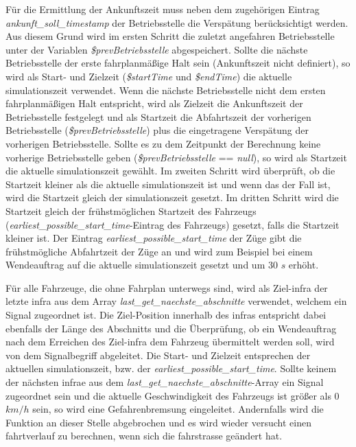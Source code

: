 Für die Ermittlung der Ankunftszeit muss neben dem zugehörigen Eintrag \textit{ankunft\_soll\_timestamp} der Betriebsstelle die Verspätung berücksichtigt werden. Aus diesem Grund wird im ersten Schritt die zuletzt angefahren Betriebsstelle unter der Variablen \textit{\$prevBetriebsstelle} abgespeichert. Sollte die nächste Betriebsstelle der erste fahrplanmäßige Halt sein (Ankunftszeit nicht definiert), so wird als Start- und Zielzeit (\textit{\$startTime} und \textit{\$endTime}) die aktuelle \Gls{simulationszeit} verwendet. Wenn die nächste Betriebsstelle nicht dem ersten fahrplanmäßigen Halt entspricht, wird als Zielzeit die Ankunftszeit der Betriebsstelle festgelegt und als Startzeit die Abfahrtszeit der vorherigen Betriebsstelle (\textit{\$prevBetriebsstelle}) plus die eingetragene Verspätung der vorherigen Betriebsstelle. Sollte es zu dem Zeitpunkt der Berechnung keine vorherige Betriebsstelle geben (\textit{\$prevBetriebsstelle} == \textit{null}), so wird als Startzeit die aktuelle \Gls{simulationszeit} gewählt. Im zweiten Schritt wird überprüft, ob die Startzeit kleiner als die aktuelle \Gls{simulationszeit} ist und wenn das der Fall ist, wird die Startzeit gleich der \Gls{simulationszeit} gesetzt. Im dritten Schritt wird die Startzeit gleich der frühstmöglichen Startzeit des Fahrzeugs (\textit{earliest\_possible\_start\_time}-Eintrag des Fahrzeugs) gesetzt, falls die Startzeit kleiner ist. Der Eintrag \textit{earliest\_possible\_start\_time} der Züge gibt die frühstmögliche Abfahrtzeit der Züge an und wird zum Beispiel bei einem Wendeauftrag auf die aktuelle \Gls{simulationszeit} gesetzt und um 30 $s$ erhöht. 

Für alle Fahrzeuge, die ohne Fahrplan unterwegs sind, wird als Ziel-\ac{infra} der letzte \ac{infra} aus dem Array \textit{last\_get\_naechste\_abschnitte} verwendet, welchem ein Signal zugeordnet ist. Die Ziel-Position innerhalb des \ac{infra}s entspricht dabei ebenfalls der Länge des Abschnitts und die Überprüfung, ob ein Wendeauftrag nach dem Erreichen des Ziel-\ac{infra} dem Fahrzeug übermittelt werden soll, wird von dem Signalbegriff abgeleitet. Die Start- und Zielzeit entsprechen der aktuellen \Gls{simulationszeit}, bzw. der \textit{earliest\_possible\_start\_time}. Sollte keinem der nächsten \ac{infra}e aus dem \textit{last\_get\_naechste\_abschnitte}-Array ein Signal zugeordnet sein und die aktuelle Geschwindigkeit des Fahrzeugs ist größer als 0 $km/h$ sein, so wird eine Gefahrenbremsung eingeleitet. Andernfalls wird die Funktion an dieser Stelle abgebrochen und es wird wieder versucht einen \Gls{fahrtverlauf} zu berechnen, wenn sich die \Gls{fahrstrasse} geändert hat.

